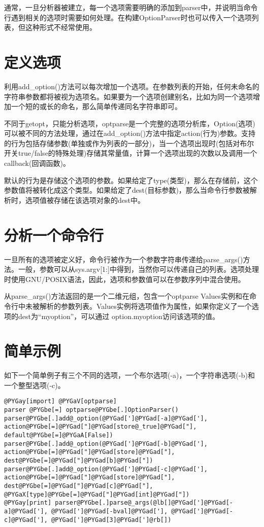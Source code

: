\documentclass[a4paper,10pt,english]{manual}
\begin{document}
通常，一旦分析器被建立，每一个选项需要明确的添加到parser中，并说明当命令行遇到相关的选项时需要如何处理。在构建OptionParser时也可以传入一个选项列表，但这种形式不经常使用。


\section{定义选项}

利用add\_option()方法可以每次增加一个选项。在参数列表的开始，任何未命名的字符串参数都将被视为选项名。如果要为一个选项创建别名，比如为同一个选项增加一个短的或长的命名，那么简单传递同名字符串即可。

不同于getopt，只能分析选项，optparse是一个完整的选项分析库，Option(选项)可以被不同的方法处理，通过在add\_option()方法中指定action(行为)参数。支持的行为包括存储参数(单独或作为列表的一部分)，当一个选项出现时(包括对布尔开关true/false的特殊处理)存储其常量值，计算一个选项出现的次数以及调用一个callback(回调函数)。

默认的行为是存储这个选项的参数。如果给定了type(类型)，那么在存储前，这个参数值将被转化成这个类型。如果给定了dest(目标参数)，那么当命令行参数被解析时，选项值被存储在该选项对象的dest中。


\section{分析一个命令行}

一旦所有的选项被定义好，命令行被作为一个参数字符串传递给parse\_args()方法。一般，参数可以从sys.argv{[}1:{]}中得到，当然你可以传递自己的列表。选项处理时使用GNU/POSIX语法，因此，选项和参数值可以在参数序列中混合使用。

从parse\_args()方法返回的是一个二维元组，包含一个optparse Values实例和在命令行中未被解析的参数列表。Values实例将选项值作为属性，如果你定义了一个选项的dest为“myoption”，可以通过 option.myoption访问该选项的值。


\section{简单示例}

如下一个简单例子有三个不同的选项，一个布尔选项(-a)，一个字符串选项(-b)和一个整型选项(-c)。

\begin{Verbatim}[commandchars=@\[\]]
@PYGay[import] @PYGaV[optparse]
parser @PYGbe[=] optparse@PYGbe[.]OptionParser()
parser@PYGbe[.]add@_option(@PYGad[']@PYGad[-a]@PYGad['], action@PYGbe[=]@PYGad["]@PYGad[store@_true]@PYGad["], default@PYGbe[=]@PYGaA[False])
parser@PYGbe[.]add@_option(@PYGad[']@PYGad[-b]@PYGad['], action@PYGbe[=]@PYGad["]@PYGad[store]@PYGad["], dest@PYGbe[=]@PYGad["]@PYGad[b]@PYGad["])
parser@PYGbe[.]add@_option(@PYGad[']@PYGad[-c]@PYGad['], action@PYGbe[=]@PYGad["]@PYGad[store]@PYGad["], dest@PYGbe[=]@PYGad["]@PYGad[c]@PYGad["], @PYGaX[type]@PYGbe[=]@PYGad["]@PYGad[int]@PYGad["])
@PYGay[print] parser@PYGbe[.]parse@_args(@lb[]@PYGad[']@PYGad[-a]@PYGad['], @PYGad[']@PYGad[-bval]@PYGad['], @PYGad[']@PYGad[-c]@PYGad['], @PYGad[']@PYGad[3]@PYGad[']@rb[])
\end{Verbatim}
\end{document}
